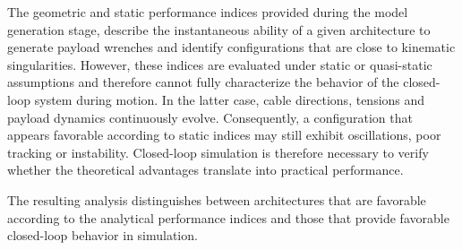 The geometric and static performance indices provided during the model generation stage, describe the instantaneous ability of a given architecture to generate payload wrenches and identify configurations that are close to kinematic singularities. However, these indices are evaluated under static or quasi-static assumptions and therefore cannot fully characterize the behavior of the closed-loop system during motion. In the latter case, cable directions, tensions and payload dynamics continuously evolve. Consequently, a configuration that appears favorable according to static indices may still exhibit oscillations, poor tracking or instability. Closed-loop simulation is therefore necessary to verify whether the theoretical advantages translate into practical performance.

The resulting analysis distinguishes between architectures that are favorable according to the analytical performance indices and those that provide favorable closed-loop behavior in simulation.

